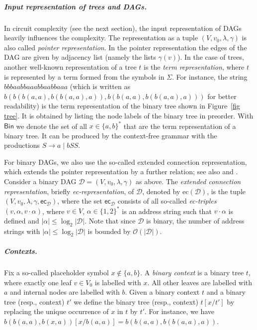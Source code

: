 \documentclass[a4paper,UKenglish,cleveref, autoref, thm-restate, numberwithinsect]{lipics-v2021}
\newcommand{\Bin}{\mathsf{Bin}}
\begin{document}
\subparagraph{Input representation of trees and DAGs.}
In circuit complexity (see the next section), the input representation of DAGs heavily influences the complexity. 
The representation as a tuple $(V, v_0, \lambda, \gamma)$ is also called \emph{pointer representation}.
In the pointer representation the edges of the DAG are given by adjacency list (namely the lists $\gamma(v)$).
In the case of trees, another well-known representation of a tree $t$ is the \emph{term representation}, where $t$ is represented by a term formed from the symbols in $\Sigma$.
For instance, the string $bbbaabbaaabbaabbaaa$ (which is written as
$b(b(b(a,a),b(b(a,a),a)),b(b(a,a),b(b(a,a),a)))$ for better readability) is the term representation
of the binary tree shown in Figure~\ref{fig tree}. It is obtained by listing the node labels of the binary tree in 
preorder.
With $\Bin$ we denote the set of all $x \in \{a,b\}^*$ that are the term representation of a binary tree.
It can be produced by the context-free grammar with the productions $S \to a \mid b S S$.

For binary DAGs, we also use the so-called extended connection representation, which extends the pointer representation
by a further relation; see also \cite{GanardiL19,Ruz81} and \cite[Definition~2.43]{Vollmer99}.
Consider a binary DAG $\mathcal{D} = (V, v_0, \lambda, \gamma)$ as above. 
The \emph{extended connection representation}, briefly \emph{ec-representation}, of $\mathcal{D}$, denoted by $\mathrm{ec}(\mathcal{D})$, is the tuple
$(V, v_0, \lambda,\gamma, \mathsf{ec}_{\mathcal{D}})$, where the set $\mathsf{ec}_{\mathcal{D}}$ consists of all  
so-called \emph{ec-triples} $(v, \alpha, v\cdot\alpha)$, where
$v \in V$, $\alpha \in \{1,2\}^*$ is an address string such that $v\cdot\alpha$ is defined and $|\alpha| \leq  \log_2 |\mathcal{D}|$.
Note that since $\mathcal{D}$ is binary, the number of   address strings with $|\alpha| \leq  \log_2 |\mathcal{D}|$ is bounded by 
$\mathcal{O}(|\mathcal{D}|)$.


\subparagraph{Contexts.}
Fix a so-called placeholder symbol $x \notin \{a,b\}$.
A \emph{binary context} is a binary tree $t$, where exactly one leaf $v \in V_0$ is labelled with
$x$. All other leaves are labelled with $a$ and internal nodes are labelled with $b$.
Given a binary context $t$ and a binary tree (resp., context) $t'$ we define 
the binary tree (resp., context) $t[x/t']$ by replacing the unique occurrence of $x$ in $t$ by $t'$.
For instance, we have $b(b(a,a),b(x,a))[x/b(a,a)] = b(b(a,a),b(b(a,a),a))$.
\end{document}
